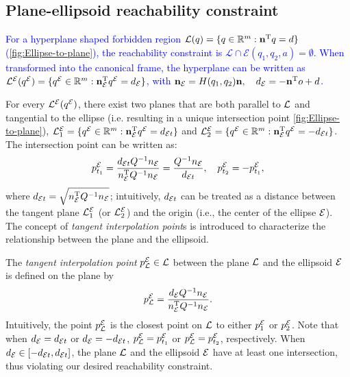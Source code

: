 \documentclass[10pt,twocolumn,twoside]{IEEEtran}
\newcommand{\new}[1]{\textcolor{blue}{#1}}
\newcommand{\news}{\color{blue}}
\begin{document}
\subsection{Plane-ellipsoid reachability constraint}\label{sec:ellipsoide-plane}

\new{For a hyperplane shaped forbidden region $\mathcal{L}(q) = \{q\in\mathbb{R}^m: \mathbf{n}^\mathrm{T} q = d\}$ (\cref{fig:Ellipse-to-plane}), the reachability constraint is $\mathcal{L} \cap \mathcal{E}(q_1,q_2,a) = \emptyset$. When transformed into the canonical frame, the hyperplane can be written as ${\mathcal{L}^{\mathcal{E}}}({q^{\mathcal{E}}}) = \{  {q^{\mathcal{E}}}\in\mathbb{R}^m:  \mathbf{n}_{\mathcal{E}}^\mathrm{T} {q^{\mathcal{E}}} = d_{\mathcal{E}}\}$, with $\mathbf{n}_{\mathcal{E}} = H(q_1,q_2)\mathbf{n}, \quad d_{\mathcal{E}} =-\mathbf{n}^\mathrm{T} o + d$.}

For every ${\mathcal{L}^{\mathcal{E}}}({q^{\mathcal{E}}})$, there exist two planes that are both parallel to $\mathcal{L}$ and tangential to the ellipse (i.e. resulting in a unique intersection point \cref{fig:Ellipse-to-plane}), $\mathcal{L}_1^{\mathcal{E}} = \{{q^{\mathcal{E}}}\in\mathbb{R}^m: \mathbf{n}_{\mathcal{E}} ^\mathrm{T} {q^{\mathcal{E}}} =  d_{\mathcal{E} t} \}$ and $\mathcal{L}_2^{\mathcal{E}} = \{{q^{\mathcal{E}}}\in\mathbb{R}^m: \mathbf{n}_{\mathcal{E}} ^\mathrm{T} {q^{\mathcal{E}}} = - d_{\mathcal{E} t} \}$. The intersection point can be written as:
\begin{equation}
    p^{\mathcal{E}}_{t_{1}} = \frac{ d_{\mathcal{E} t} Q^{-1}   n_{\mathcal{E}}}{ n_{\mathcal{E}} ^\mathrm{T} Q^{-1}  n_{\mathcal{E}}} = \frac{Q^{-1} n_{\mathcal{E}}}{ d_{\mathcal{E} t}},\quad  p^{\mathcal{E}}_{t_{2}} = -  p^{\mathcal{E}}_{t_{1}},
\end{equation}
where $d_{\mathcal{E} t} = \sqrt{ n_{\mathcal{E}}^\mathrm{T} Q^{-1} n_{\mathcal{E}}}$; intuitively, $d_{\mathcal{E} t}$ can be treated as a distance between the tangent plane $\mathcal{L}_1^{\mathcal{E}}$ (or $\mathcal{L}_2^{\mathcal{E}}$) and the origin (i.e., the center of the ellipse $\mathcal{E}$). The concept of \emph{tangent interpolation point}s is introduced to characterize the relationship between the plane and the ellipsoid.

\begin{definition}
 {\news The \emph{tangent interpolation point} $p^{\mathcal{E}}_{\mathcal{L}} \in \mathcal{L}$ between the plane $\mathcal{L}$ and the ellipsoid $\mathcal{E}$ is defined on the plane by } 
    \begin{equation}\label{equ:ProjectPoint}
      p^{\mathcal{E}}_{\mathcal{L}} = \frac{ d_{\mathcal{E}} Q^{-1} n_{\mathcal{E}}}{ n_{\mathcal{E}}^\mathrm{T} Q^{-1} n_{\mathcal{E}}}.
    \end{equation}
  Intuitively, the point $p^{\mathcal{E}}_{\mathcal{L}}$ is the closest point on $\mathcal{L}$ to either $p^{\mathcal{E}}_1$ or $p^{\mathcal{E}}_2$.
  Note that when  $d_{\mathcal{E}}=d_{\mathcal{E} t}$ or $d_{\mathcal{E}}=-d_{\mathcal{E} t}$, $p^{\mathcal{E}}_{\mathcal{L}}=p^{\mathcal{E}}_{t_1}$ or $p^{\mathcal{E}}_{\mathcal{L}}=p^{\mathcal{E}}_{t_2}$, respectively. When $ d_{\mathcal{E}} \in [- d_{\mathcal{E} t},  d_{\mathcal{E} t}]$, the plane $\mathcal{L}$ and the ellipsoid $\mathcal{E}$ have at least one intersection, thus violating our desired reachability constraint. 
\end{definition}
\end{document}
